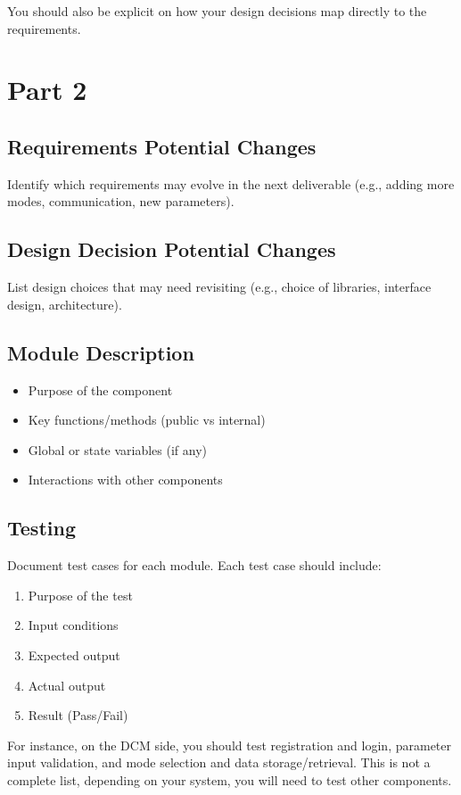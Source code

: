 \documentclass{article}
\begin{document}
You should also be explicit on how your design decisions map directly to the requirements.

\section{Part 2}

\subsection{Requirements Potential Changes}
Identify which requirements may evolve in the next deliverable (e.g., adding more modes, communication, new parameters).

\subsection{Design Decision Potential Changes}
List design choices that may need revisiting (e.g., choice of libraries, interface design, architecture).

\subsection{Module Description}
\begin{itemize}
    \item Purpose of the component
    \item Key functions/methods (public vs internal)
    \item Global or state variables (if any)
    \item Interactions with other components
\end{itemize}

\subsection{Testing}
Document test cases for each module. Each test case should include:

\begin{enumerate}
    \item Purpose of the test
    \item Input conditions
    \item Expected output
    \item Actual output
    \item Result (Pass/Fail)
\end{enumerate}

For instance, on the DCM side, you should test registration and login, parameter input validation, and mode selection and data storage/retrieval. This is not a complete list, depending on your system, you will need to test other components.
\end{document}
